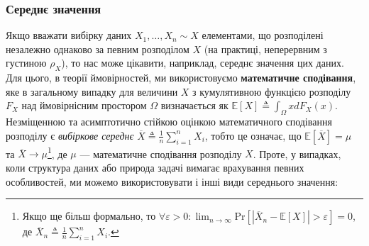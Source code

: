 \documentclass{exam_template}
\begin{document}
\subsubsection{Середнє значення}\label{sec:mean}
Якщо вважати вибірку даних $X_1,\dots, X_n \sim X$ елементами, що розподілені
незалежно однаково за певним розподілом $X$ (на практиці, неперервним з густиною
$\rho_X$), то нас може цікавити, наприклад, середнє значення цих даних. Для
цього, в теорії ймовірностей, ми використовуємо \textbf{математичне сподівання},
яке в загальному випадку для величини $X$ з кумулятивною функцією розподілу
$F_X$ над ймовірнісним простором $\Omega$ визначається як $\mathbb{E}[X]
\triangleq \int_{\Omega} x dF_X(x)$. Незміщенною та асимптотично стійкою оцінкою
математичного сподівання розподілу є \textit{вибіркове середнє} $\overline{X}
\triangleq \frac{1}{n}\sum_{i=1}^n X_i$, тобто це означає, що
$\mathbb{E}[\overline{X}] = \mu$ та $\overline{X} \xrightarrow{}
\mu$\footnote{Якщо ще більш формально, то $\forall \varepsilon > 0: \lim_{n \to
\infty}\text{Pr}\left[\left|\overline{X}_n - \mathbb{E}[X]\right| >
\varepsilon\right] = 0$, де $\overline{X}_n \triangleq \frac{1}{n}\sum_{i=1}^n
X_i$.}, де $\mu$ — математичне сподівання розподілу $X$. Проте, у випадках, коли
структура даних або природа задачі вимагає врахування певних особливостей, ми
можемо використовувати і інші види середнього значення:
\end{document}
